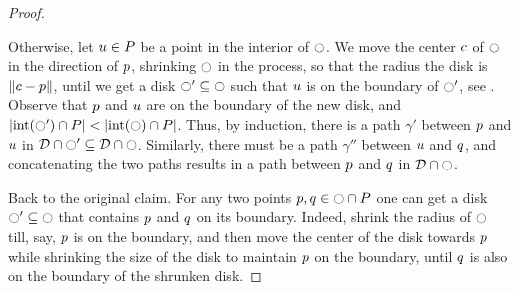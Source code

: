 \documentclass[12pt]{article}%
\begin{document}
\begin{proof}
\begin{figure}[h]
    \end{figure}
    Otherwise, let $u\in P$ be a point in the interior of
    $\ocircle$. We move the center $c$ of $\ocircle$ in the direction of
    $p$, shrinking $\ocircle$ in the process, so that the radius the
    disk is $\left\| c - p \right\|$, until we get a disk
    $\ocircle' \subseteq \ocircle$ such that $u$ is on the boundary of
    $\ocircle'$, see . Observe that $p$ and $u$ are on
    the boundary of the new disk, and
    $|\interiorX{\disk'} \cap \PS| < |\interiorX{\disk} \cap
    \PS|$. Thus, by induction, there is a path $\gamma'$ between $p$
    and $u$ in
    $\mathcal{D} \cap {\ocircle'} \subseteq
    \mathcal{D} \cap {\ocircle}$. Similarly, there must be a path
    $\gamma''$ between $u$ and $q$, and concatenating the two
    paths results in a path between $p$ and $q$ in
    $\mathcal{D} \cap {\ocircle}$.

    Back to the original claim.  For any two points
    $p,q \in \ocircle \cap P$ one can get a disk
    $\ocircle' \subseteq \ocircle$ that contains $p$ and $q$ on its
    boundary.  Indeed, shrink the radius of $\ocircle$ till, say, $p$
    is on the boundary, and then move the center of the disk towards
    $p$ while shrinking the size of the disk to maintain $p$ on
    the boundary, until $q$ is also on the boundary of the shrunken
    disk.
\end{proof}
\end{document}
